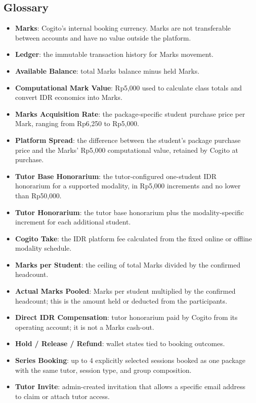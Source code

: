\documentclass[11pt,a4paper]{article}
\begin{document}
\subsection{Glossary}
\begin{itemize}
	\item \textbf{Marks}: Cogito's internal booking currency. Marks are not transferable between accounts and have no value outside the platform.
	\item \textbf{Ledger}: the immutable transaction history for Marks movement.
	\item \textbf{Available Balance}: total Marks balance minus held Marks.
	\item \textbf{Computational Mark Value}: Rp5,000 used to calculate class totals and convert IDR economics into Marks.
	\item \textbf{Marks Acquisition Rate}: the package-specific student purchase price per Mark, ranging from Rp6,250 to Rp5,000.
	\item \textbf{Platform Spread}: the difference between the student's package purchase price and the Marks' Rp5,000 computational value, retained by Cogito at purchase.
	\item \textbf{Tutor Base Honorarium}: the tutor-configured one-student IDR honorarium for a supported modality, in Rp5,000 increments and no lower than Rp50,000.
	\item \textbf{Tutor Honorarium}: the tutor base honorarium plus the modality-specific increment for each additional student.
	\item \textbf{Cogito Take}: the IDR platform fee calculated from the fixed online or offline modality schedule.
	\item \textbf{Marks per Student}: the ceiling of total Marks divided by the confirmed headcount.
	\item \textbf{Actual Marks Pooled}: Marks per student multiplied by the confirmed headcount; this is the amount held or deducted from the participants.
	\item \textbf{Direct IDR Compensation}: tutor honorarium paid by Cogito from its operating account; it is not a Marks cash-out.
	\item \textbf{Hold / Release / Refund}: wallet states tied to booking outcomes.
	\item \textbf{Series Booking}: up to 4 explicitly selected sessions booked as one package with the same tutor, session type, and group composition.
	\item \textbf{Tutor Invite}: admin-created invitation that allows a specific email address to claim or attach tutor access.

\end{itemize}
\end{document}
